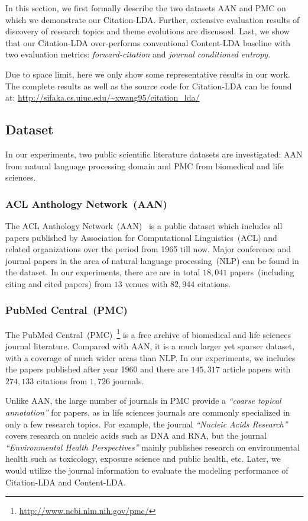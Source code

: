 In this section, we first formally describe the two datasets AAN and PMC on
which we demonstrate our Citation-LDA. Further, extensive evaluation results of
discovery of research topics and theme evolutions are discussed. Last, we show
that our Citation-LDA over-performs conventional Content-LDA baseline with two
evaluation metrics: \emph{forward-citation} and \emph{journal conditioned
entropy}.

Due to space limit, here we only show some representative results in our work.
The complete results as well as the source code for Citation-LDA can be found
at: \url{http://sifaka.cs.uiuc.edu/~xwang95/citation_lda/}

\subsection{Dataset}

In our experiments, two public scientific literature datasets are investigated:
AAN from natural language processing domain and PMC from biomedical and life
sciences.

\subsubsection{ACL Anthology Network~(AAN)}

The ACL Anthology Network~(AAN)~\cite{radev2009acl} is a public dataset which
includes all papers published by Association for Computational Linguistics~(ACL)
and related organizations over the period from 1965 till now. Major conference
and journal papers in the area of natural language processing~(NLP) can be found
in the dataset. In our experiments, there are are in total $18,041$
papers~(including citing and cited papers) from $13$ venues with $82,944$
citations.

\subsubsection{PubMed Central~(PMC)}

The PubMed Central~(PMC)~\footnote{\url{http://www.ncbi.nlm.nih.gov/pmc/}} is a
free archive of biomedical and life sciences journal literature. Compared with
AAN, it is a much larger yet sparser dataset, with a coverage of much wider
areas than NLP. In our experiments, we includes the papers published after year
1960 and there are $145,317$ article papers with $274,133$ citations from
$1,726$ journals.

Unlike AAN, the large number of journals in PMC provide a \emph{``coarse topical
annotation''} for papers, as in life sciences journals are commonly specialized
in only a few research topics. For example, the journal \emph{``Nucleic Acids
Research''} covers research on nucleic acids such as DNA and RNA, but the
journal \emph{``Environmental Health Perspectives''} mainly publishes research
on environmental health such as toxicology, exposure science and public health,
etc. Later, we would utilize the journal information to evaluate the modeling
performance of Citation-LDA and Content-LDA.

